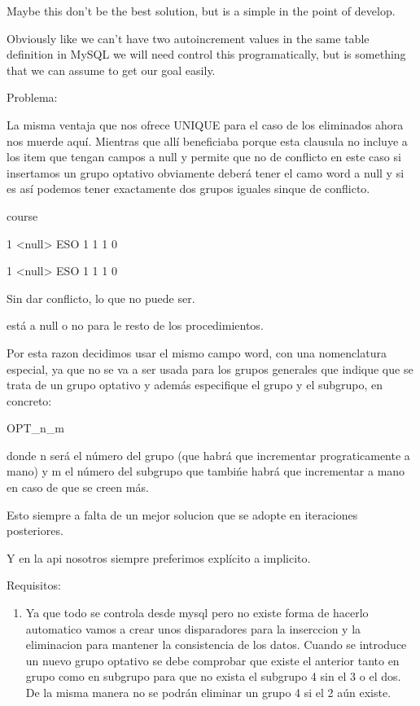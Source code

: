 Maybe this don't be the best solution, but is a simple in the point
of develop.

Obviously like we can't have two autoincrement values in the same
table definition in MySQL we will need control this programatically,
but is something that we can assume to get our goal easily.

Problema:

La misma ventaja que nos ofrece UNIQUE para el caso de los eliminados
ahora nos muerde aquí. Mientras que allí beneficiaba porque esta clausula
no incluye a los item que tengan campos a null y permite que no de
conflicto en este caso si insertamos un grupo optativo obviamente
deberá tener el camo word a null y si es así podemos tener exactamente
dos grupos iguales sinque de conflicto.

course

1 <null> ESO 1 1 1 0

1 <null> ESO 1 1 1 0

Sin dar conflicto, lo que no puede ser.



está a null o no para le resto de los procedimientos.

Por esta razon decidimos usar el mismo campo word, con una nomenclatura
especial, ya que no se va a ser usada para los grupos generales que
indique que se trata de un grupo optativo y además especifique el
grupo y el subgrupo, en concreto:

OPT\_n\_m

donde n será el número del grupo (que habrá que incrementar prograticamente
a mano) y m el número del subgrupo que tambi\'{n}e habrá que incrementar
a mano en caso de que se creen más.

Esto siempre a falta de un mejor solucion que se adopte en iteraciones
posteriores.

Y en la api nosotros siempre preferimos explícito a implicito.

Requisitos:
\begin{enumerate}
\item Ya que todo se controla desde mysql pero no existe forma de hacerlo
automatico vamos a crear unos disparadores para la inserccion y la
eliminacion para mantener la consistencia de los datos. Cuando se
introduce un nuevo grupo optativo se debe comprobar que existe el
anterior tanto en grupo como en subgrupo para que no exista el subgrupo
4 sin el 3 o el dos. De la misma manera no se podrán eliminar un grupo
4 si el 2 aún existe.
\end{enumerate}

